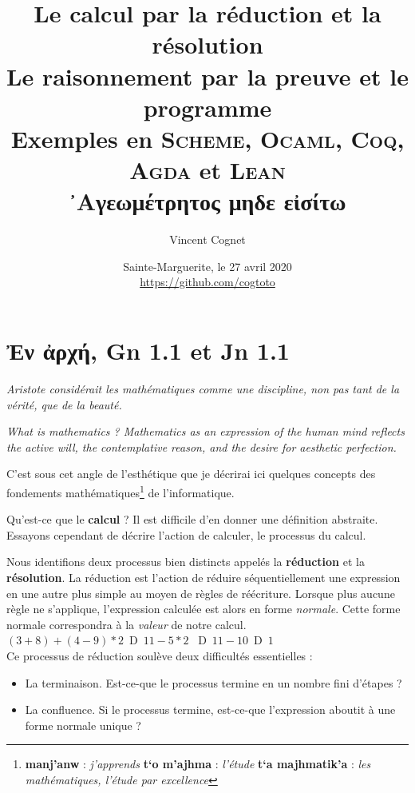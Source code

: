 \documentclass[11pt]{book}
\title{Le calcul par la réduction et la résolution \\
       Le raisonnement par la preuve et le programme \\

	 Exemples en \textsc{Scheme}, \textsc{Ocaml}, \textsc{Coq}, \textsc{Agda} et \textsc{Lean}\\ \vspace{1cm}
   ᾿Αγεωμέτρητος μηδε εἰσίτω \\
      }
\author{Vincent Cognet}
\date{Sainte-Marguerite, le 27 avril 2020 \\
      \url{https://github.com/cogtoto}}
\newcommand{\imp}{{\letterimp D}\hspace{0.1cm}}
\begin{document}
\frontmatter
\maketitle
\tableofcontents
\mainmatter

\chapter{Ἐν ἀρχή, Gn 1.1 et Jn 1.1}

\textit{Aristote considérait les mathématiques comme une discipline, non pas tant de la vérité, que de la beauté.}
\cite{ab}

\textit{What is mathematics ? Mathematics as an expression of the human mind reflects
the active will, the contemplative reason, and the desire for aesthetic perfection.} \cite{wm}

C'est sous cet angle de l'esthétique que je décrirai ici quelques concepts des fondements 
mathématiques\footnote{\textgreek{\textbf{manj'anw}} : \textit{j'apprends} 
\textgreek{\textbf{t`o m'ajhma}} : \textit{l'étude} 
\textgreek{\textbf{t`a majhmatik'a}} : \textit{les mathématiques, l'étude par excellence}} de l'informatique. \\

 \vspace{0.5cm}

Qu'est-ce que le \textbf{calcul} ? Il est difficile d'en donner une définition abstraite. Essayons cependant de 
décrire l'action de calculer, le processus du calcul. 

Nous identifions deux processus bien distincts appelés la \textbf{réduction} et la \textbf{résolution}.
La réduction est l'action de réduire séquentiellement une expression en une autre plus simple
au moyen de règles de réécriture. Lorsque plus aucune règle ne s'applique, l'expression calculée
 est alors en forme
\textit{normale}. Cette forme normale correspondra à la \textit{valeur} de notre calcul. \\
$(3+8)+(4-9)*2$ \,\imp\,  $11 -5*2$ \, \imp\, $11 -10$ \,\imp\, $1$ \\

Ce processus de réduction soulève deux difficultés essentielles : 
\begin{itemize}
	\item La terminaison. Est-ce-que le processus termine en un nombre fini d'étapes ?
	\item La confluence. Si le processus termine, est-ce-que l'expression aboutit à une forme normale unique ?
\end{itemize}
\end{document}
